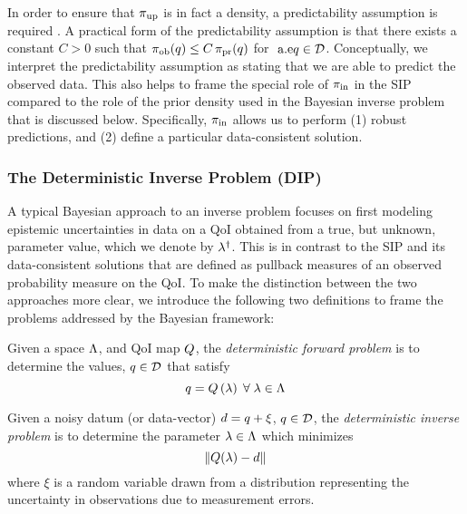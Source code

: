 In order to ensure that $\operatorname*{\pi_{up}}$ is in fact a density, a predictability assumption is required \cite{BJW18a}.
A practical form of the predictability assumption is that there exists a constant $C>0$ such that $\operatorname*{\pi_{ob}}(q)\leq C\operatorname*{\pi_{pr}}(q)$ for $\text{ a.e} q\in\mathcal{D}$.
Conceptually, we interpret the predictability assumption as stating that we are able to predict the observed data.
This also helps to frame the special role of $\operatorname*{\pi_{in}}$ in the SIP compared to the role of the prior density used in the Bayesian inverse problem that is discussed below.
Specifically, $\operatorname*{\pi_{in}}$ allows us to perform (1) robust predictions, and (2) define a particular data-consistent solution.




\subsubsection{The Deterministic Inverse Problem (DIP)}
A typical Bayesian approach to an inverse problem focuses on first modeling epistemic uncertainties in data on a QoI obtained from a true, but unknown, parameter value, which we denote by $\lambda^\dagger$.
This is in contrast to the SIP and its data-consistent solutions that are defined as pullback measures of an observed probability measure on the QoI.
To make the distinction between the two approaches more clear, we introduce the following two definitions to frame the problems addressed by the Bayesian framework:


\begin{defn}
  Given a space ${\Lambda}$, and QoI map $Q$, the \emph{deterministic forward problem} is to determine the values, $q \in \mathcal{D}$ that satisfy
  \begin{equation}
    q = Q\left ( \lambda \right ) \; \forall \; \lambda \in {\Lambda}
  \end{equation}
\end{defn}

\begin{defn}
  Given a noisy datum (or data-vector) $d = q + \xi$, $q \in \mathcal{D}$, the \emph{deterministic inverse problem} is to determine the parameter $\lambda \in {\Lambda}$ which minimizes
  \begin{equation}
    \left\Vert Q(\lambda) - d\right\Vert
  \end{equation}
  where $\xi$ is a random variable drawn from a distribution representing the uncertainty in observations due to measurement errors.
\end{defn}

